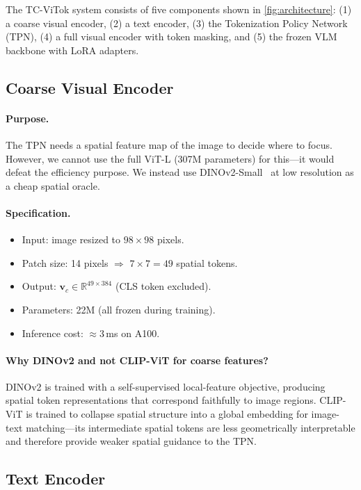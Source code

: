 \documentclass[12pt,a4paper]{article}
\newcommand{\R}{\mathbb{R}}
\newcommand{\vv}{\mathbf{v}}     %
\begin{document}
The TC-ViTok system consists of five components shown in \cref{fig:architecture}:
(1) a coarse visual encoder, (2) a text encoder, (3) the Tokenization Policy
Network (TPN), (4) a full visual encoder with token masking, and (5) the frozen
VLM backbone with LoRA adapters.

\subsection{Coarse Visual Encoder}
\label{subsec:coarse}

\paragraph{Purpose.}
The TPN needs a spatial feature map of the image to decide where to focus.
However, we cannot use the full ViT-L (307M parameters) for this---it would
defeat the efficiency purpose. We instead use DINOv2-Small~\citep{oquab2023dinov2}
at low resolution as a cheap spatial oracle.

\paragraph{Specification.}
\begin{itemize}[leftmargin=2em]
  \item Input: image resized to $98 \times 98$ pixels.
  \item Patch size: 14 pixels $\Rightarrow$ $7 \times 7 = 49$ spatial tokens.
  \item Output: $\vv_c \in \R^{49 \times 384}$ (CLS token excluded).
  \item Parameters: 22M (all frozen during training).
  \item Inference cost: $\approx 3$\,ms on A100.
\end{itemize}

\paragraph{Why DINOv2 and not CLIP-ViT for coarse features?}
DINOv2 is trained with a self-supervised local-feature objective, producing
spatial token representations that correspond faithfully to image regions.
CLIP-ViT is trained to collapse spatial structure into a global embedding for
image-text matching---its intermediate spatial tokens are less geometrically
interpretable and therefore provide weaker spatial guidance to the TPN.

\subsection{Text Encoder}
\label{subsec:text}
\end{document}
